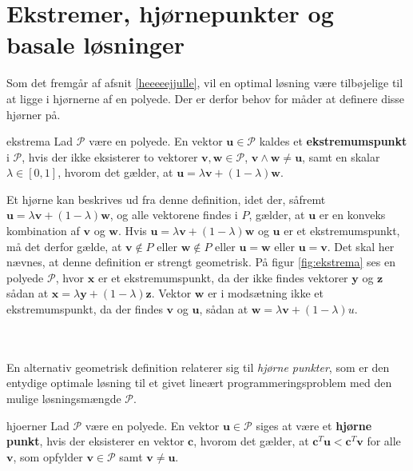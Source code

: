 \section{Ekstremer, hjørnepunkter og basale løsninger}
%
Som det fremgår af afsnit \ref{heeeeejjulle}, vil en optimal løsning være tilbøjelige til at ligge i hjørnerne af en polyede.
Der er derfor behov for måder at definere disse hjørner på.
%
\begin{defn}{}{ekstrema}
Lad $\mathcal{P}$ være en polyede. 
En vektor $\mathbf{u} \in \mathcal{P}$ kaldes et \textbf{ekstremumspunkt} i $\mathcal{P}$, hvis der ikke eksisterer to vektorer $\mathbf{v},\mathbf{w} \in \mathcal{P}$, $\mathbf{v} \land \mathbf{w} \neq \mathbf{u}$, 
samt en skalar $\lambda \in [0,1]$, hvorom det gælder, at $\mathbf{u}=\lambda\mathbf{v}+(1-\lambda)\textbf{w}$.
\end{defn}
\noindent
%
%
Et hjørne kan beskrives ud fra denne definition, idet der, såfremt $\mathbf{u}=\lambda\mathbf{v}+(1-\lambda) \mathbf{w}$, og alle vektorene findes i $P$, gælder, at $\mathbf{u}$ er en konveks kombination af $\mathbf{v}$ og $\mathbf{w}$.
Hvis $\mathbf{u}=\lambda\mathbf{v}+(1-\lambda) \textbf{w}$ og $\mathbf{u}$ er et ekstremumspunkt, må det derfor gælde, at $\mathbf{v}\notin P$ eller $\mathbf{w}\notin P$ eller $\mathbf{u}=\mathbf{w}$ eller $\mathbf{u}=\mathbf{v}$.
Det skal her nævnes, at denne definition er strengt geometrisk. 
På figur \ref{fig:ekstrema} ses en polyede $\mathcal{P}$, hvor $\textbf{x}$ er et ekstremumspunkt, da der ikke findes vektorer $\textbf{y}$ og $\textbf{z}$ sådan at $\mathbf{x}=\lambda\mathbf{y}+(1-\lambda) \mathbf{z}$. Vektor $\textbf{w}$ er i modsætning ikke et ekstremumspunkt, da der findes $\textbf{v}$ og $\textbf{u}$, sådan at $\mathbf{w}=\lambda\mathbf{v}+(1-\lambda)u$.
%

\\\\
%
En alternativ geometrisk definition relaterer sig til \textit{hjørne punkter}, som er den entydige optimale løsning til et givet lineært programmeringsproblem med den mulige løsningsmængde $\mathcal{P}$.
%
\begin{defn}{}{hjoerner}
Lad $\mathcal{P}$ være en polyede. 
En vektor $\mathbf{u}\in \mathcal{P}$ siges at være et \textbf{hjørne punkt}, hvis der eksisterer en vektor $\mathbf{c}$, hvorom det gælder, at $\mathbf{c}^T\mathbf{u}<\mathbf{c}^T\mathbf{v}$ for alle $\mathbf{v}$, som opfylder $\mathbf{v} \in \mathcal{P}$ samt $\mathbf{v}\neq\mathbf{u}$.
\end{defn}
